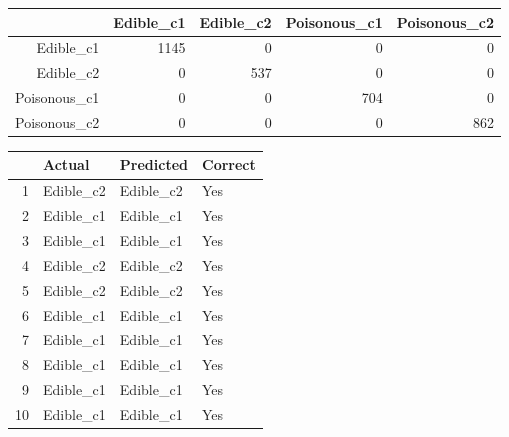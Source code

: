 \documentclass[10pt  ,usenames, dvipsnames]{article}\usepackage[]{graphicx}\usepackage[]{color}
\makeatletter
\newenvironment{kframe}{%
 \def\at@end@of@kframe{}%
 \ifinner\ifhmode%
  \def\at@end@of@kframe{\end{minipage}}%
  \begin{minipage}{\columnwidth}%
 \fi\fi%
 \def\FrameCommand##1{\hskip\@totalleftmargin \hskip-\fboxsep
 \colorbox{shadecolor}{##1}\hskip-\fboxsep
     \hskip-\linewidth \hskip-\@totalleftmargin \hskip\columnwidth}%
 \MakeFramed {\advance\hsize-\width
   \@totalleftmargin\z@ \linewidth\hsize
   \@setminipage}}%
 {\par\unskip\endMakeFramed%
 \at@end@of@kframe}
\newenvironment{knitrout}{}{} %
\makeatother
\begin{document}
\begin{knitrout}
\color{fgcolor}\begin{kframe}


{\ttfamily\noindent\bfseries\color{errorcolor}{\#\# Error in eval(expr, envir, enclos): object 'results' not found}}\end{kframe}
\end{knitrout}

\clearpage

\begin{table}[ht]
\centering
\begin{tabular}{rrrrr}
  \hline
 & Edible\_c1 & Edible\_c2 & Poisonous\_c1 & Poisonous\_c2 \\ 
  \hline
Edible\_c1 & 1145 &   0 &   0 &   0 \\ 
  Edible\_c2 &   0 & 537 &   0 &   0 \\ 
  Poisonous\_c1 &   0 &   0 & 704 &   0 \\ 
  Poisonous\_c2 &   0 &   0 &   0 & 862 \\ 
   \hline
\end{tabular}
\end{table}




\begin{table}[ht]
\centering
\begin{tabular}{rlll}
  \hline
 & Actual & Predicted & Correct \\ 
  \hline
1 & Edible\_c2 & Edible\_c2 & Yes \\ 
  2 & Edible\_c1 & Edible\_c1 & Yes \\ 
  3 & Edible\_c1 & Edible\_c1 & Yes \\ 
  4 & Edible\_c2 & Edible\_c2 & Yes \\ 
  5 & Edible\_c2 & Edible\_c2 & Yes \\ 
  6 & Edible\_c1 & Edible\_c1 & Yes \\ 
  7 & Edible\_c1 & Edible\_c1 & Yes \\ 
  8 & Edible\_c1 & Edible\_c1 & Yes \\ 
  9 & Edible\_c1 & Edible\_c1 & Yes \\ 
  10 & Edible\_c1 & Edible\_c1 & Yes \\ 
   \hline
\end{tabular}
\end{table}
\end{document}
